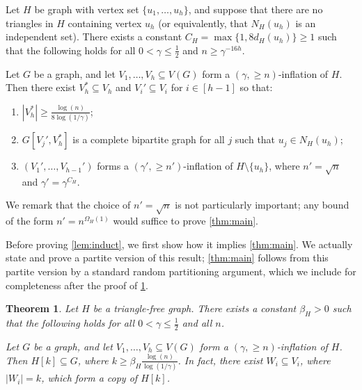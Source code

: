 \documentclass[11pt]{article}
\numberwithin{equation}{section}
\theoremstyle{plain}
\newtheorem{theorem}{Theorem}[section]
\theoremstyle{remark}
\newcommand\ab[1]{\lvert #1 \rvert}
\begin{document}
\begin{lemma}\label{lem:induct}
    Let $H$ be graph with vertex set $\{u_1,\dots,u_h\}$, and suppose that there are no triangles in $H$ containing vertex $u_h$ (or equivalently, that $N_H(u_h)$ is an independent set). There exists a constant $C_H=\max \{1,8d_H(u_h)\}\geq 1$ such that the following holds for all $0<\gamma \leq \frac 12$ and $n \geq \gamma^{-16h}$.
    
    Let $G$ be a graph, and let $V_1,\dots,V_h \subseteq V(G)$ form a $(\gamma,\geq n)$-inflation of $H$.
    Then there exist $V_h^*\subseteq V_h$ and $V_i'\subseteq V_i$ for $i\in [h-1]$ so that:
    \begin{enumerate}
        \item $|V_h^*|\ge \frac{\log(n)}{8\log(1/\gamma)}$;
        \item $G[V_j',V_h^*]$ is a complete bipartite graph for all $j$ such that $u_j\in N_H(u_h)$;
        \item $(V_1',\dots,V_{h-1}')$ forms a $(\gamma',\geq n')$-inflation of $H \setminus \{u_h\}$, where $n' =\sqrt n$ and $\gamma' = \gamma^{C_H}$.
    \end{enumerate}
\end{lemma}
We remark that the choice of $n' = \sqrt n$ is not particularly important; any bound of the form $n' = n^{\Omega_H(1)}$ would suffice to prove \cref{thm:main}.

Before proving \cref{lem:induct}, we first show how it implies \cref{thm:main}. We actually state and prove a partite version of this result; \cref{thm:main} follows from this partite version by a standard random partitioning argument, which we include for completeness after the proof of \cref{thm:nikiforov partite}.
\begin{theorem}\label{thm:nikiforov partite}
    Let $H$ be a triangle-free graph. There exists a constant $\beta_H>0$ such that the following holds for all $0<\gamma\leq \frac 12$ and all $n$. 

    Let $G$ be a graph, and let $V_1,\dots,V_h \subseteq V(G)$ form a $(\gamma,\geq n)$-inflation of $H$. Then $H[k] \subseteq G$, where $k \geq \beta_H \frac{\log(n)}{\log(1/\gamma)}$. In fact, there exist $W_i \subseteq V_i$, where $\ab{W_i}=k$, which form a copy of $H[k]$.
\end{theorem}
\end{document}
